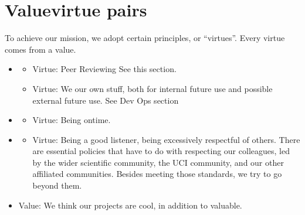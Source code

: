 \documentclass[letterpaper,10pt,english]{sphinxmanual}
\begin{document}
\section{Value\sphinxhyphen{}virtue pairs}
\label{\detokenize{01OurMission:value-virtue-pairs}}
\sphinxAtStartPar
To achieve our mission, we adopt certain principles, or “virtues”. Every virtue comes from a value.
\begin{itemize}
\item {} \begin{description}
\begin{itemize}
\item {} 
\sphinxAtStartPar
Virtue: Peer Reviewing See this {\hyperref[\detokenize{PeerReviewing:peer-reviewing}]{}} section.

\item {} 
\sphinxAtStartPar
Virtue: We  our own stuff, both for internal future use and possible external future use. See Dev Ops section

\end{itemize}

\end{description}

\item {} \begin{description}
\begin{itemize}
\item {} 
\sphinxAtStartPar
Virtue: Being on\sphinxhyphen{}time.

\end{itemize}

\end{description}

\item {} \begin{description}
\begin{itemize}
\item {} 
\sphinxAtStartPar
Virtue: Being a good listener, being excessively respectful of others. There are essential policies that have to do with respecting our colleagues, led by the wider scientific community, the UCI community, and our other affiliated communities. Besides meeting those standards, we try to go beyond them.

\end{itemize}

\end{description}

\item {} 
\sphinxAtStartPar
Value: We think our projects are cool, in addition to valuable.
\sphinxhyphen{} 

\end{itemize}
\end{document}
